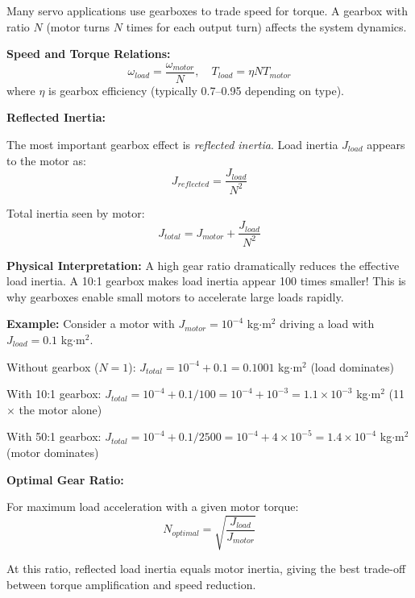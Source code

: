 Many servo applications use gearboxes to trade speed for torque. A gearbox with ratio $N$ (motor turns $N$ times for each output turn) affects the system dynamics.

\textbf{Speed and Torque Relations:}
\begin{equation}
    \omega_{load} = \frac{\omega_{motor}}{N}, \quad T_{load} = \eta N T_{motor}
\end{equation}
where $\eta$ is gearbox efficiency (typically 0.7--0.95 depending on type).

\textbf{Reflected Inertia:}

The most important gearbox effect is \textit{reflected inertia}. Load inertia $J_{load}$ appears to the motor as:
\begin{equation}
    J_{reflected} = \frac{J_{load}}{N^2}
\end{equation}

Total inertia seen by motor:
\begin{equation}
    \boxed{J_{total} = J_{motor} + \frac{J_{load}}{N^2}}
    \label{eq:reflected_inertia}
\end{equation}

\textbf{Physical Interpretation:} A high gear ratio dramatically reduces the effective load inertia. A 10:1 gearbox makes load inertia appear 100 times smaller! This is why gearboxes enable small motors to accelerate large loads rapidly.

\textbf{Example:} Consider a motor with $J_{motor} = 10^{-4}$ kg$\cdot$m$^2$ driving a load with $J_{load} = 0.1$ kg$\cdot$m$^2$.

Without gearbox ($N = 1$): $J_{total} = 10^{-4} + 0.1 = 0.1001$ kg$\cdot$m$^2$ (load dominates)

With 10:1 gearbox: $J_{total} = 10^{-4} + 0.1/100 = 10^{-4} + 10^{-3} = 1.1 \times 10^{-3}$ kg$\cdot$m$^2$ (11$\times$ the motor alone)

With 50:1 gearbox: $J_{total} = 10^{-4} + 0.1/2500 = 10^{-4} + 4 \times 10^{-5} = 1.4 \times 10^{-4}$ kg$\cdot$m$^2$ (motor dominates)

\textbf{Optimal Gear Ratio:}

For maximum load acceleration with a given motor torque:
\begin{equation}
    \boxed{N_{optimal} = \sqrt{\frac{J_{load}}{J_{motor}}}}
    \label{eq:optimal_gear_ratio}
\end{equation}

At this ratio, reflected load inertia equals motor inertia, giving the best trade-off between torque amplification and speed reduction.

